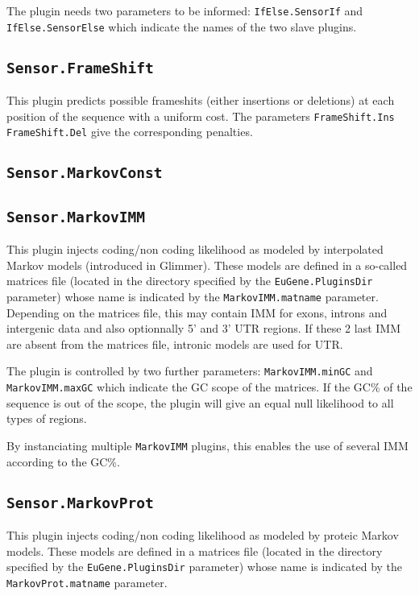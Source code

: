 \documentclass[a4paper,titlepage]{report}
\begin{document}
The plugin needs two parameters to be informed:
\texttt{IfElse.SensorIf} and \texttt{IfElse.SensorElse} which indicate
the names of the two slave plugins.

\subsection{\texttt{Sensor.FrameShift}}

This plugin predicts possible frameshits (either insertions or
deletions) at each position of the sequence with a uniform cost. The
parameters \texttt{FrameShift.Ins} \texttt{FrameShift.Del} give the
corresponding penalties.

\subsection{\texttt{Sensor.MarkovConst}}



\subsection{\texttt{Sensor.MarkovIMM}}

This plugin injects coding/non coding likelihood as modeled by
interpolated Markov models (introduced in Glimmer). These models are
defined in a so-called matrices file (located in the directory 
specified by the \texttt{EuGene.PluginsDir} parameter) whose name is indicated by the
\texttt{MarkovIMM.matname} parameter. Depending on the matrices file,
this may contain IMM for exons, introns and intergenic data and also
optionnally 5' and 3' UTR regions. If these 2 last IMM are absent from
the matrices file, intronic models are used for UTR.

The plugin is controlled by two further parameters:
\texttt{MarkovIMM.minGC} and \texttt{MarkovIMM.maxGC} which indicate
the GC scope of the matrices. If the GC\% of the sequence is out of
the scope, the plugin will give an equal null likelihood to all types
of regions.

By instanciating multiple \texttt{MarkovIMM} plugins, this enables the use 
of several IMM according to the GC\%.

\subsection{\texttt{Sensor.MarkovProt}}

This plugin injects coding/non coding likelihood as modeled by proteic
Markov models. These models are defined in a matrices file  (located in the directory 
specified by the \texttt{EuGene.PluginsDir} parameter) whose name
is indicated by the \texttt{MarkovProt.matname} parameter. 
\end{document}
